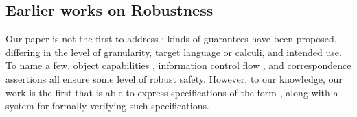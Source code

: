  
 
\vspace{.04in}
 
 \subsection{Earlier works on Robustness} 
Our paper is not the first   to address %
:
 { 
kinds of} guarantees have been proposed, differing in the level 
of granularity,   target  language or calculi, and intended use.  {To name a few,}
object capabilities  \cite{MillerPhD, dd, threoremsFreeSep}, 
information control flow \cite{Zdancewic:Myers:01,noninteferenceOS}, 
and correspondence assertions \cite{Maffeis:aiamb:thesis00}
all
ensure some level of robust safety. 
{However, to our knowledge, 
our work is the first that is able to 
express specifications of the form %
 \SrobustB, along with a system
for formally verifying such specifications.}

